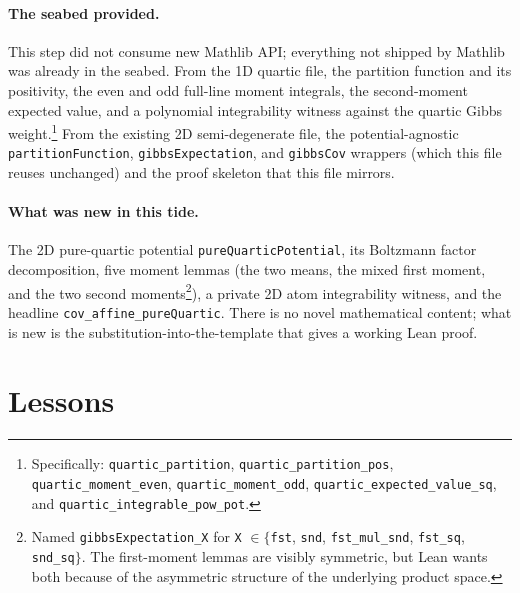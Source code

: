 \documentclass[11pt]{article}
\begin{document}
\paragraph{The seabed provided.}
This step did not consume new Mathlib API; everything not shipped by
Mathlib was already in the seabed. From the 1D quartic file, the
partition function and its positivity, the even and odd full-line
moment integrals, the second-moment expected value, and a polynomial
integrability witness against the quartic Gibbs
weight.\footnote{Specifically: \texttt{quartic\_partition},
\texttt{quartic\_partition\_pos}, \texttt{quartic\_moment\_even},
\texttt{quartic\_moment\_odd}, \texttt{quartic\_expected\_value\_sq},
and \texttt{quartic\_integrable\_pow\_pot}.} From the existing 2D
semi-degenerate file, the potential-agnostic
\texttt{partitionFunction}, \texttt{gibbsExpectation}, and
\texttt{gibbsCov} wrappers (which this file reuses unchanged) and the
proof skeleton that this file mirrors.

\paragraph{What was new in this tide.}
The 2D pure-quartic potential
\texttt{pureQuarticPotential}, its Boltzmann factor decomposition, five
moment lemmas (the two means, the mixed first moment, and the two
second moments\footnote{Named \texttt{gibbsExpectation\_X} for
\texttt{X} $\in \{$\texttt{fst}, \texttt{snd}, \texttt{fst\_mul\_snd},
\texttt{fst\_sq}, \texttt{snd\_sq}$\}$. The first-moment lemmas are
visibly symmetric, but Lean wants both because of the asymmetric
structure of the underlying product space.}),
a private 2D atom integrability witness, and the headline
\texttt{cov\_affine\_pureQuartic}. There is no novel mathematical
content; what is new is the substitution-into-the-template that gives a
working Lean proof.

\section{Lessons}
\end{document}
